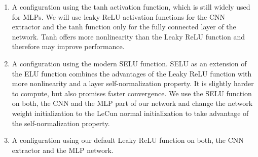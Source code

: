 \begin{enumerate}
    \item A configuration using the tanh activation function, which is still widely used for MLPs. We will use leaky ReLU activation functions for the CNN extractor and the tanh function only for the fully connected layer of the network. Tanh offers more nonlinearity than the Leaky ReLU function and therefore may improve performance.
    \item A configuration using the modern SELU function. SELU as an extension of the ELU function combines the advantages of the Leaky ReLU function with more nonlinearity and a layer self-normalization property. It is slightly harder to compute, but also promises faster convergence. We use the SELU function on both, the CNN and the MLP part of our network and change the network weight initialization to the LeCun normal initialization to take advantage of the self-normalization property.
    \item A configuration using our default Leaky ReLU function on both, the CNN extractor and the MLP network.
\end{enumerate}

